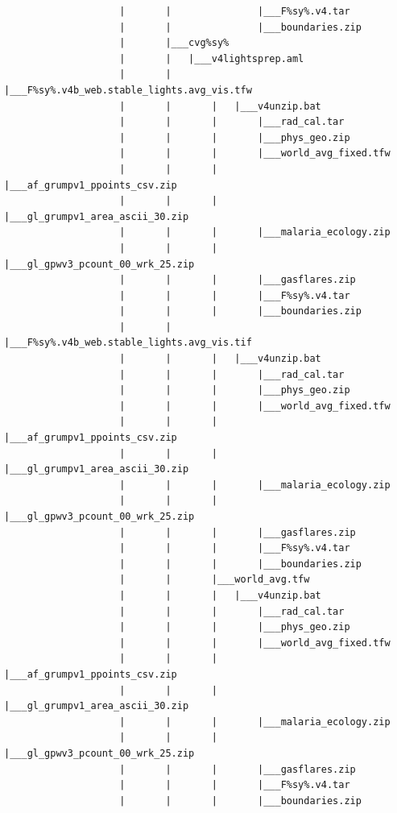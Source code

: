 \documentclass[
]{book}
\begin{document}
\begin{verbatim}
                    |       |               |___F%sy%.v4.tar
                    |       |               |___boundaries.zip
                    |       |___cvg%sy%
                    |       |   |___v4lightsprep.aml
                    |       |       |___F%sy%.v4b_web.stable_lights.avg_vis.tfw
                    |       |       |   |___v4unzip.bat
                    |       |       |       |___rad_cal.tar
                    |       |       |       |___phys_geo.zip
                    |       |       |       |___world_avg_fixed.tfw
                    |       |       |       |___af_grumpv1_ppoints_csv.zip
                    |       |       |       |___gl_grumpv1_area_ascii_30.zip
                    |       |       |       |___malaria_ecology.zip
                    |       |       |       |___gl_gpwv3_pcount_00_wrk_25.zip
                    |       |       |       |___gasflares.zip
                    |       |       |       |___F%sy%.v4.tar
                    |       |       |       |___boundaries.zip
                    |       |       |___F%sy%.v4b_web.stable_lights.avg_vis.tif
                    |       |       |   |___v4unzip.bat
                    |       |       |       |___rad_cal.tar
                    |       |       |       |___phys_geo.zip
                    |       |       |       |___world_avg_fixed.tfw
                    |       |       |       |___af_grumpv1_ppoints_csv.zip
                    |       |       |       |___gl_grumpv1_area_ascii_30.zip
                    |       |       |       |___malaria_ecology.zip
                    |       |       |       |___gl_gpwv3_pcount_00_wrk_25.zip
                    |       |       |       |___gasflares.zip
                    |       |       |       |___F%sy%.v4.tar
                    |       |       |       |___boundaries.zip
                    |       |       |___world_avg.tfw
                    |       |       |   |___v4unzip.bat
                    |       |       |       |___rad_cal.tar
                    |       |       |       |___phys_geo.zip
                    |       |       |       |___world_avg_fixed.tfw
                    |       |       |       |___af_grumpv1_ppoints_csv.zip
                    |       |       |       |___gl_grumpv1_area_ascii_30.zip
                    |       |       |       |___malaria_ecology.zip
                    |       |       |       |___gl_gpwv3_pcount_00_wrk_25.zip
                    |       |       |       |___gasflares.zip
                    |       |       |       |___F%sy%.v4.tar
                    |       |       |       |___boundaries.zip

\end{verbatim}
\end{document}
